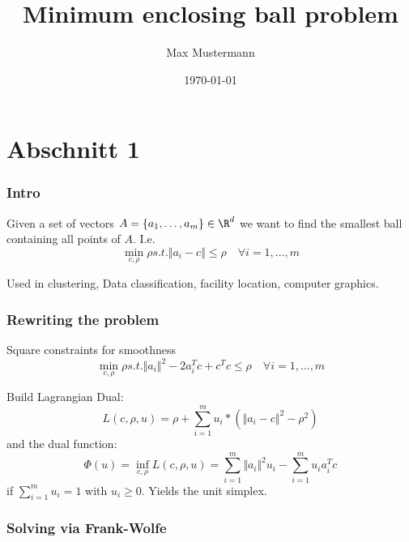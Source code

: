 \documentclass{beamer}
\title{Minimum enclosing ball problem}
\author{Max Mustermann}
\date{\today}
\begin{document}
\maketitle
\frame{\tableofcontents[currentsection]}

\section{Abschnitt 1}

\begin{frame}
  \frametitle{Intro} %
  \begin{Definition} %
    Given a set of vectors $A = \{a_1, \dots, a_m\}\in \R^d$ we want to find the smallest ball containing all points of $A$.
    I.e.
    \begin{equation}
      \min_{c,\rho}  \rho
      s.t. \Vert a_i -c  \Vert \le \rho \quad \forall i=1, \dots, m
    \end{equation}
  \end{Definition}
  Used in clustering, Data classification, facility location, computer graphics.
\end{frame}

\begin{frame}
  \frametitle{Rewriting the problem}
  Square constraints for smoothness
    \begin{equation}
      \min_{c,\rho}  \rho
      s.t. \Vert a_i \Vert^2 - 2 a_i^T c + c^T c  \le \rho \quad \forall i=1, \dots, m
    \end{equation}

    Build Lagrangian Dual:
    \begin{equation}
      L(c, \rho, u) = \rho + \sum_{i=1}^m u_i *  (\Vert a_i -c  \Vert^2- \rho^2)
    \end{equation}
    and the dual function:
    \begin{equation}
      \Phi(u) = \inf_{c, \rho} L(c, \rho, u) = \sum_{i=1}^m \Vert a_i \Vert^2u_i - \sum_{i=1}^{m} u_i a_i^T c
    \end{equation}
    if $\sum_{i=1}^{m} u_i = 1$ with $u_i \ge 0$. Yields the unit simplex.

\end{frame}

\begin{frame}
  \frametitle{Solving via Frank-Wolfe}

\end{frame}
\end{document}
